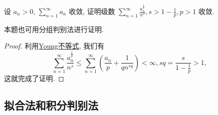 \documentclass[../../main.tex]{subfiles}
\begin{document}
\begin{example}
设 $a_n > 0$, $\sum_{n=1}^{\infty} a_n$ 收敛, 证明级数 $\sum_{n=1}^{\infty} \frac{a_n^{\frac{1}{p}}}{n^s}, s > 1 - \frac{1}{p}, p > 1$ 收敛.
\end{example}
\begin{remark}
本题也可用分组判别法进行证明.
\end{remark}
\begin{proof}
利用\hyperref[theorem:Young不等式]{Young不等式}, 我们有
\[
\sum_{n=1}^{\infty} \frac{a_n^{\frac{1}{p}}}{n^s} \leqslant \sum_{n=1}^{\infty} \left( \frac{a_n}{p} + \frac{1}{q n^{s q}} \right) < \infty, s q = \frac{s}{1 - \frac{1}{p}} > 1,
\]
这就完成了证明.

\end{proof}


\subsection{拟合法和积分判别法}
\end{document}
